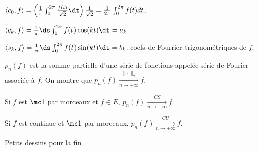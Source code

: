 \begin{exemple}
    $\langle c_0, f \rangle = \left( \frac 1 \pi \int_{0}^{2 \pi} \frac{f(t)}{\sqrt 2} \dt \right) \frac 1 {\sqrt 2} = \frac{1}{2 \pi} \int_{0}^{2 \pi} f(t) dt$.

    $\langle c_k, f \rangle = \frac 1 \pi \ds \int_{0}^{2 \pi} f(t) \cos(kt) \dt = a_k$ 

    $\langle s_k, f \rangle = \frac 1 \pi \ds \int_{0}^{2 \pi} f(t) \sin(kt) \dt = b_k$. coefs de Fourrier trigonométriques de $f$. 

    $p_n(f)$ est la somme partielle d'une série de fonctions appelée série de Fourier associée 
    à $f$. On montre que $p_n(f) \xrightarrow[n \to + \infty]{\| \cdot \|_2} f$. 

    Si $f$ est $\mc 1$ par morceaux et $f \in E$, $p_n(f) \xrightarrow[n \to + \infty]{CS} f$.

    Si $f$ est continue et $\mc 1$ par morceaux, $p_n(f) \xrightarrow[n \to + \infty]{CU} f$.

    Petits dessins pour la fin 
\end{exemple}

